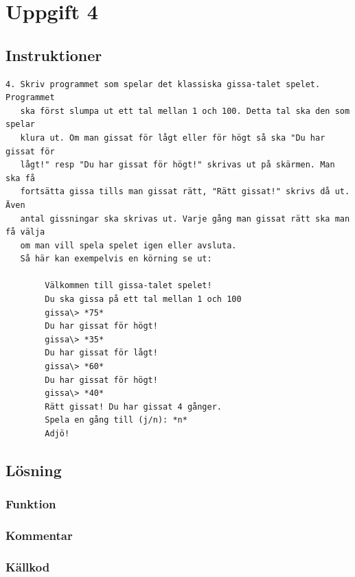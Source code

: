 \section{Uppgift 4}\label{sec:uppg04}

\subsection{Instruktioner}
\begin{verbatim}
4. Skriv programmet som spelar det klassiska gissa-talet spelet.  Programmet
   ska först slumpa ut ett tal mellan 1 och 100. Detta tal ska den som spelar
   klura ut. Om man gissat för lågt eller för högt så ska "Du har gissat för
   lågt!" resp "Du har gissat för högt!" skrivas ut på skärmen. Man ska få
   fortsätta gissa tills man gissat rätt, "Rätt gissat!" skrivs då ut. Även
   antal gissningar ska skrivas ut. Varje gång man gissat rätt ska man få välja
   om man vill spela spelet igen eller avsluta.
   Så här kan exempelvis en körning se ut:

        Välkommen till gissa-talet spelet!
        Du ska gissa på ett tal mellan 1 och 100
        gissa\> *75*
        Du har gissat för högt!
        gissa\> *35*
        Du har gissat för lågt!
        gissa\> *60*
        Du har gissat för högt!
        gissa\> *40*
        Rätt gissat! Du har gissat 4 gånger.
        Spela en gång till (j/n): *n*
        Adjö!
\end{verbatim}


\subsection{Lösning}
\subsubsection{Funktion}

\subsubsection{Kommentar}


\subsubsection{Källkod}
\label{src:uppg04}


